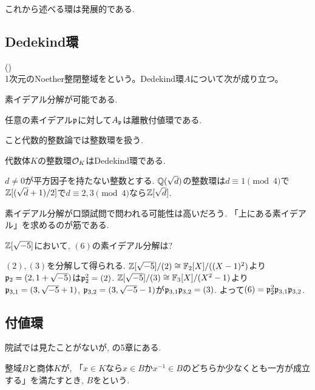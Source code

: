 これから述べる環は発展的である.



\subsection{Dedekind環}

\begin{prop} ()\\
1次元のNoether整閉整域をという。Dedekind環$A$について次が成り立つ。
\ben
\item 素イデアル分解が可能である.
\item 任意の素イデアル$\mathfrak{p}$に対して$A_{\mathfrak{p}}$は離散付値環である.
\een
\end{prop}
こと代数的整数論では整数環を扱う.
\begin{theo}
代数体$K$の整数環$\mathcal{O}_K$はDedekind環である.
\end{theo}

\begin{recall} $d\neq 0$が平方因子を持たない整数とする.
$\mathbb{Q}(\sqrt{d})$の整数環は$d\equiv 1\pmod{4}$で$\mathbb{Z}[(\sqrt{d}+1)/2]$で$d\equiv 2,3\pmod{4}$なら$\mathbb{Z}[\sqrt{d}]$.
\end{recall}

素イデアル分解が口頭試問で問われる可能性は高いだろう. 「上にある素イデアル」を求めるのが筋である.



\begin{egprob}
$\mathbb{Z}[\sqrt{-5}]$において, $(6)$の素イデアル分解は?
\end{egprob}

\begin{egans}
$(2),(3)$を分解して得られる. $\mathbb{Z}[\sqrt{-5}]/(2)\cong \mathbb{F}_{2}[X]/((X-1)^2)$より$\mathfrak{p}_{2}=(2,1+\sqrt{-5})$は$\mathfrak{p}_{2}^2 = (2)$. $\mathbb{Z}[\sqrt{-5}]/(3)\cong \mathbb{F}_{3}[X]/(X^2-1)$より$\mathfrak{p}_{3,1} = (3,\sqrt{-5} + 1)$, $\mathfrak{p}_{3,2} = (3,\sqrt{-5}-1)$が$\mathfrak{p}_{3,1}\mathfrak{p}_{3,2} = (3)$. よって$(6) = \mathfrak{p}_{2}^2\mathfrak{p}_{3,1}\mathfrak{p}_{3,2}$.
\end{egans}

\begin{recall}
\end{recall}

\subsection{付値環} %
院試では見たことがないが, \cite{atimac}の5章にある.
\begin{defn}
整域$B$と商体$K$が, 「$x\in K$なら$x\in B$か$x^{-1}\in B$のどちらか少なくとも一方が成立する」を満たすとき, $B$をという.
\end{defn}

